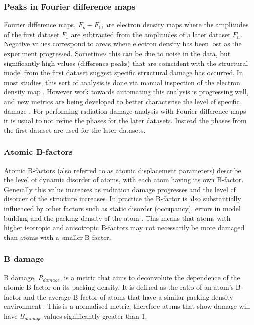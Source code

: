         \subsubsection{Peaks in Fourier difference maps}
        \label{subs:Peaks in Fourier difference maps}
            Fourier difference maps, $F_n - F_1$, are electron density maps where the amplitudes of the first dataset $F_1$ are subtracted from the amplitudes of a later dataset $F_n$.
			Negative values correspond to areas where electron density has been lost as the experiment progressed.
			Sometimes this can be due to noise in the data, but significantly high values (difference peaks) that are coincident with the structural model from the first dataset suggest specific structural damage has occurred.
			In most studies, this sort of analysis is done via manual inspection of the electron density map \cite{burmeister2000structural,weik2000,ravelli2000}.
			However work towards automating this analysis is progressing well, and new metrics are being developed to better characterise the level of specific damage \cite{bury2015radiation}.
            For performing radiation damage analysis with Fourier difference maps it is usual to not refine the phases for the later datasets.
            Instead the phases from the first dataset are used for the later datasets.

        \subsubsection{Atomic B-factors}
        \label{subs:Atomic B-factors}
            Atomic B-factors (also referred to as atomic displacement parameters) describe the level of dynamic disorder of atoms, with each atom having its own B-factor.
			Generally this value increases as radiation damage progresses and the level of disorder of the structure increases.
			In practice the B-factor is also substantially influenced by other factors such as static disorder (occupancy), errors in model building and the packing density of the atom \cite{gerstel2015identifying}.
			This means that atoms with higher isotropic and anisotropic B-factors may not necessarily be more damaged than atoms with a smaller B-factor.

        \subsubsection{B damage}
        \label{subs:B damage}
            B damage, $B_{damage}$, is a metric that aims to deconvolute the dependence of the atomic B factor on its packing density.
			It is defined as the ratio of an atom's B-factor and the average B-factor of atoms that have a similar packing density environment \cite{gerstel2015identifying}.
			This is a normalised metric, therefore atoms that show damage will have $B_{damage}$ values significantly greater than 1.

